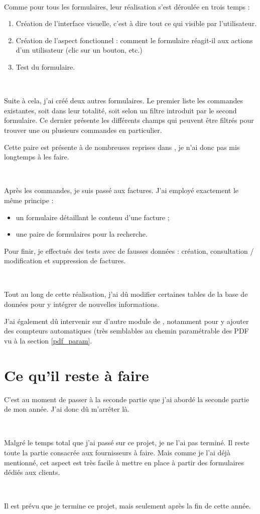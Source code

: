 ~

Comme pour tous les formulaires, leur réalisation s'est déroulée en trois temps :
\begin{enumerate}
	\item Création de l'interface visuelle, c'est à dire tout ce qui visible par l'utilisateur.
	\item Création de l'aspect fonctionnel : comment le formulaire réagit-il aux actions d'un utilisateur (clic sur un bouton, etc.)
	\item Test du formulaire.
\end{enumerate}

~

Suite à cela, j'ai créé deux autres formulaires. Le premier liste les commandes existantes, soit dans leur totalité, soit selon un filtre introduit par le second formulaire. Ce dernier présente les différents champs qui peuvent être filtrés pour trouver une ou plusieurs commandes en particulier.

Cette paire est présente à de nombreuses reprises dans \integrale, je n'ai donc pas mis longtemps à les faire.

~

Après les commandes, je suis passé aux factures. J'ai employé exactement le même principe :
\begin{itemize}
	\item un formulaire détaillant le contenu d'une facture ;
	\item une paire de formulaires pour la recherche.
\end{itemize}

Pour finir, je effectués des tests avec de fausses données : création, consultation / modification et suppression de factures.

~

Tout au long de cette réalisation, j'ai dû modifier certaines tables de la base de données pour y intégrer de nouvelles informations.

J'ai également dû intervenir sur d'autre module de \integrale, notamment pour y ajouter des compteurs automatiques (très semblables au chemin paramétrable des PDF vu à la section \ref{pdf_param}.

\section{Ce qu'il reste à faire}
C'est au moment de passer à la seconde partie que j'ai abordé la seconde partie de mon année. J'ai donc dû m'arrêter là.

~

Malgré le temps total que j'ai passé sur ce projet, je ne l'ai pas terminé. Il reste toute la partie consacrée aux fournisseurs à faire. Mais comme je l'ai déjà mentionné, cet aspect est très facile à mettre en place à partir des formulaires dédiés aux clients.

~

Il est prévu que je termine ce projet, mais seulement après la fin de cette année.